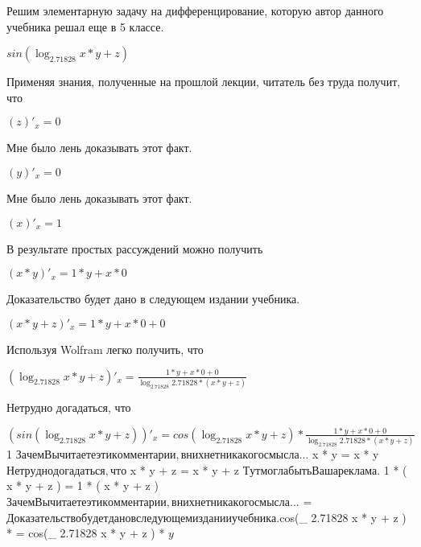 \documentclass[12pt,a4paper,fleqn]{article}
\theoremstyle{definition}
\begin{document}
Решим элементарную задачу на дифференцирование, которую автор данного учебника решал еще в 5 классе.


$sin(\log_{ 2.71828 }{ x  *  y  +  z })$

Применяя знания, полученные на прошлой лекции, читатель без труда получит, что 

$( z )'_{x} =  0 $

Мне было лень доказывать этот факт.

$( y )'_{x} =  0 $

Мне было лень доказывать этот факт.

$( x )'_{x} =  1 $

В результате простых рассуждений можно получить 

$( x  *  y )'_{x} =  1  *  y  +  x  *  0 $

Доказательство будет дано в следующем издании учебника. 

$( x  *  y  +  z )'_{x} =  1  *  y  +  x  *  0  +  0 $

Используя Wolfram легко получить, что 

$(\log_{ 2.71828 }{ x  *  y  +  z })'_{x} = \frac{ 1  *  y  +  x  *  0  +  0 }{\log_{ 2.71828 }{ 2.71828 } * ( x  *  y  +  z )}
$

Нетрудно догадаться, что 

$(sin(\log_{ 2.71828 }{ x  *  y  +  z }))'_{x} = cos(\log_{ 2.71828 }{ x  *  y  +  z }) * \frac{ 1  *  y  +  x  *  0  +  0 }{\log_{ 2.71828 }{ 2.71828 } * ( x  *  y  +  z )}
$
 1 $

Зачем Вы читаете эти комментарии, в них нет никакого смысла... 

$ x  *  y  =  x  *  y $

Нетрудно догадаться, что 

$ x  *  y  +  z  =  x  *  y  +  z $

Тут могла быть Ваша реклама. 

$ 1  * ( x  *  y  +  z ) =  1  * ( x  *  y  +  z )$

Зачем Вы читаете эти комментарии, в них нет никакого смысла... 

$
 = 
$

Доказательство будет дано в следующем издании учебника. 

$cos(\log_{ 2.71828 }{ x  *  y  +  z }) * 
 = cos(\log_{ 2.71828 }{ x  *  y  +  z }) * 
$
 y $
\end{document}
